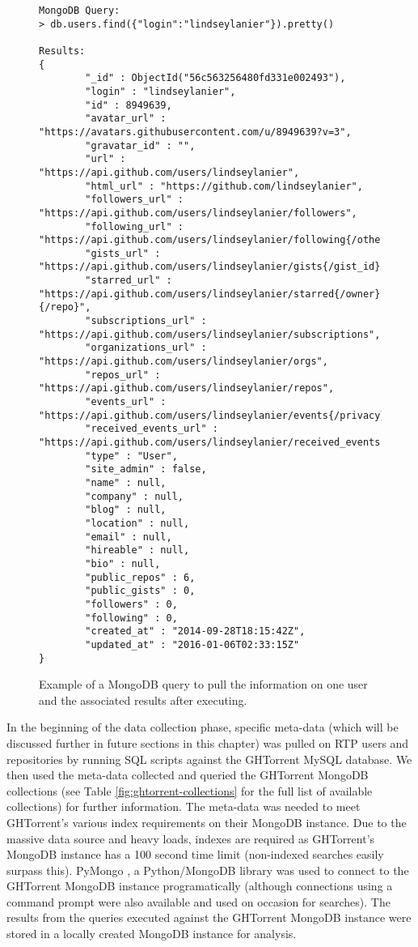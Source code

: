 \begin{figure}
\tiny
\begin{lstlisting}
MongoDB Query:
> db.users.find({"login":"lindseylanier"}).pretty()

Results:
{
        "_id" : ObjectId("56c563256480fd331e002493"),
        "login" : "lindseylanier",
        "id" : 8949639,
        "avatar_url" : "https://avatars.githubusercontent.com/u/8949639?v=3",
        "gravatar_id" : "",
        "url" : "https://api.github.com/users/lindseylanier",
        "html_url" : "https://github.com/lindseylanier",
        "followers_url" : "https://api.github.com/users/lindseylanier/followers",
        "following_url" : "https://api.github.com/users/lindseylanier/following{/other_user}",
        "gists_url" : "https://api.github.com/users/lindseylanier/gists{/gist_id}",
        "starred_url" : "https://api.github.com/users/lindseylanier/starred{/owner}{/repo}",
        "subscriptions_url" : "https://api.github.com/users/lindseylanier/subscriptions",
        "organizations_url" : "https://api.github.com/users/lindseylanier/orgs",
        "repos_url" : "https://api.github.com/users/lindseylanier/repos",
        "events_url" : "https://api.github.com/users/lindseylanier/events{/privacy}",
        "received_events_url" : "https://api.github.com/users/lindseylanier/received_events",
        "type" : "User",
        "site_admin" : false,
        "name" : null,
        "company" : null,
        "blog" : null,
        "location" : null,
        "email" : null,
        "hireable" : null,
        "bio" : null,
        "public_repos" : 6,
        "public_gists" : 0,
        "followers" : 0,
        "following" : 0,
        "created_at" : "2014-09-28T18:15:42Z",
        "updated_at" : "2016-01-06T02:33:15Z"
}
\end{lstlisting}
\caption{Example of a MongoDB query to pull the information on one user and the associated results after executing.}
\label{fig:example-MongoDB}
\end{figure}

In the beginning of the data collection phase, specific meta-data (which will be discussed further in future sections in this chapter) was pulled on RTP users and repositories by running SQL scripts against the GHTorrent MySQL database. We then used the meta-data collected and queried the GHTorrent MongoDB collections (see Table \ref{fig:ghtorrent-collections} for the full list of available collections) for further information. The meta-data was needed to meet GHTorrent's various index requirements on their MongoDB instance. Due to the massive data source and heavy loads, indexes are required as GHTorrent's MongoDB instance has a 100 second time limit (non-indexed searches easily surpass this). PyMongo \cite{_pymongo_????}, a Python/MongoDB library was used to connect to the GHTorrent MongoDB instance programatically (although connections using a command prompt were also available and used on occasion for searches). The results from the queries executed against the GHTorrent MongoDB instance were stored in a locally created MongoDB instance for analysis. 

